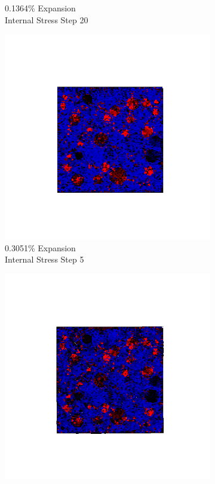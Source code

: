 \begin{figure}[ht!]
\begin{subfigure}{.25\textwidth}
      \caption{0.1364\% Expansion\\Internal Stress Step 20}
    \end{subfigure}
    \begin{subfigure}{.25\textwidth}
      \centering
      \includegraphics[width=1.0\linewidth]{Files/exp_3D/ASR/A15P75_3_s5.png}
      \caption{0.3051\% Expansion\\Internal Stress Step 5}
    \end{subfigure}%
    \begin{subfigure}{.25\textwidth}
      \centering
      \includegraphics[width=1.0\linewidth]{Files/exp_3D/ASR/A15P75_3_s10.png}

\end{subfigure}
\end{figure}
